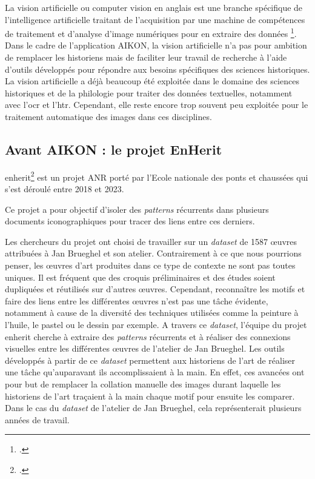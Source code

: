 	La vision artificielle ou computer vision en anglais est \og une branche spécifique de l'intelligence artificielle traitant de l'acquisition par une machine de compétences de traitement et d'analyse d'image numériques pour en extraire des données \fg \footcite{norindrTraitementSourcesHistoriques2023}.
	Dans le cadre de l'application AIKON, la vision artificielle n'a pas pour ambition de remplacer les historiens mais de faciliter leur travail de recherche à l'aide d'outils développés pour répondre aux besoins spécifiques des sciences historiques. 
	La vision artificielle a déjà beaucoup été exploitée dans le domaine des sciences historiques et de la philologie pour traiter des données textuelles, notamment avec l'\gls{ocr} et l'\gls{htr}. Cependant, elle reste encore trop souvent peu exploitée pour le traitement automatique des images dans ces disciplines.

\subsection{Avant AIKON : le projet EnHerit}

\gls{enherit}\footcite{EnHeritEnhancingHeritage} est un projet ANR porté par l'Ecole nationale des ponts et chaussées qui s'est déroulé entre 2018 et 2023.

Ce projet a pour objectif d'isoler des \textit{patterns} récurrents dans plusieurs documents iconographiques pour tracer des liens entre ces derniers.

Les chercheurs du projet ont choisi de travailler sur un \textit{dataset} de 1587 œuvres attribuées à Jan Brueghel et son atelier. Contrairement à ce que nous pourrions penser, les œuvres d'art produites dans ce type de contexte ne sont pas toutes uniques. Il est fréquent que des croquis préliminaires et des études soient dupliquées et réutilisés sur d'autres œuvres. Cependant, reconnaître les motifs et faire des liens entre les différentes œuvres n'est pas une tâche évidente, notamment à cause de la diversité des techniques utilisées comme la peinture à l'huile, le pastel ou le dessin par exemple. A travers ce \textit{dataset}, l'équipe du projet \gls{enherit} cherche à extraire des \textit{patterns} récurrents et à réaliser des connexions visuelles entre les différentes œuvres de l'atelier de Jan Brueghel. Les outils développés à partir de ce \textit{dataset} permettent aux historiens de l'art de réaliser une tâche qu'auparavant ils accomplissaient à la main. En effet, ces avancées ont pour but de remplacer la collation manuelle des images durant laquelle les historiens de l'art traçaient à la main chaque motif pour ensuite les comparer. Dans le cas du \textit{dataset} de l'atelier de Jan Brueghel, cela représenterait plusieurs années de travail.

